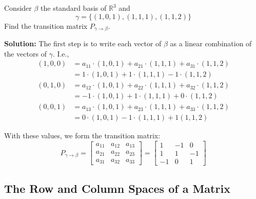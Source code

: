 \begin{example}
Consider $\beta$ the standard basis of $\mathbb{R}^3$ and \[ \gamma = \{(1,0,1),(1,1,1),(1,1,2)\}\] Find the transition matrix $P_{\gamma \to \beta}$.

\textbf{Solution:} The first step is to write each vector of $\beta$ as a linear combination of the vectors of $\gamma$. I.e.,
	\begin{equation*}
		\begin{aligned}
		(1,0,0) &= a_{11} \cdot (1,0,1) + a_{21} \cdot (1,1,1) + a_{31} \cdot (1,1,2) \\
		&= 1 \cdot (1,0,1) + 1 \cdot (1,1,1) - 1 \cdot (1,1,2)
		\end{aligned}
	\end{equation*}
	\begin{equation*}
		\begin{aligned}
		(0,1,0) &= a_{12} \cdot (1,0,1) + a_{22} \cdot (1,1,1) + a_{32} \cdot (1,1,2) \\
		&= -1 \cdot (1,0,1) + 1 \cdot (1,1,1) + 0 \cdot (1,1,2)
		\end{aligned}
	\end{equation*}
	\begin{equation*}
		\begin{aligned}
		(0,0,1) &= a_{13} \cdot  (1,0,1) + a_{23} \cdot  (1,1,1) + a_{33}  \cdot (1,1,2) \\
		&= 0 \cdot (1,0,1) - 1 \cdot (1,1,1) + 1 (1,1,2)
		\end{aligned}
	\end{equation*}

With these values, we form the transition matrix:
\[
P_{\gamma \to \beta} =
	\begin{bmatrix}
	a_{11} & a_{12} & a_{13} \\
	a_{21} & a_{22} & a_{23} \\
	a_{31} & a_{32} & a_{33}
	\end{bmatrix}
	=
	\begin{bmatrix}
	1 & -1 & 0 \\
	1 & 1 & -1 \\
	-1 & 0 & 1
	\end{bmatrix}
	\]
\end{example}

\subsection{The Row and Column Spaces of a Matrix}


